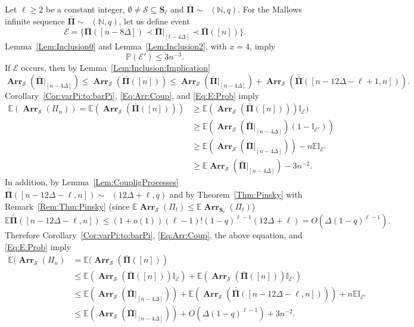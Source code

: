 \documentclass[letterpaper,11pt]{article}
\theoremstyle{definition}
\theoremstyle{remark}
\renewcommand{\le}{\leqslant}
\renewcommand{\ge}{\geqslant}
\DeclareMathOperator{\Mallows}{Mallows_{seq}}
\newcommand{\bE}{\mathbb{E}}
\newcommand{\bS}{\mathbf{S}}
\newcommand{\Arr}{\ensuremath{\operatorname{\mathbf{Arr}}}}
\newcommand{\Pra}[1]{\mathbb{P}\left(#1\right)}
\newcommand{\Ind}{\mathbb{I}}
\newcommand{\barPi}{\bar {\mathbf \Pi}}
\newcommand{\barbarPi}{{\bar{\bar {\mathbf \Pi}}}}
\newcommand{\NN}{\mathbb{N}}
\newcommand{\cS}{\mathcal{S}}
\newcommand{\cE}{\mathcal{E}}
\newcommand{\subseq}{\prec}
\begin{document}
Let $\ell\ge 2$ be a constant integer, $\emptyset\neq\cS\subseteq \bS_\ell$ and $\barPi\sim \Mallows(\NN,q)$. 
For the Mallows infinite sequence $\barPi\sim \Mallows(\NN,q)$,  let us define event
\begin{equation}\label{Eq:E:Def}
	\cE=\{\barPi([n-8\Delta])\subseq \barPi|_{[t-4\Delta]}\subseq \barPi([n])\}.
\end{equation}
Lemma~\ref{Lem:Inclusion0} and Lemma~\ref{Lem:Inclusion2}, with $x=4$, imply
\begin{equation}\label{Eq:E:Prob}
	\Pra{\cE'}\le 3n^{-3}.
\end{equation}
If $\cE$ occurs, then by Lemma~\ref{Lem:Inclusion:Implication}
\begin{equation}\label{Eq:Arr:Coup}
	\Arr_{\cS}(\barPi|_{[n-4\Delta]})\le \Arr_{\cS}(\barPi([n]))\le \Arr_{\cS}(\barPi|_{[n-4\Delta]})+\Arr_{\cS}(\barbarPi([n-12\Delta-\ell+1,n])).
\end{equation}
Corollary~\ref{Cor:varPi:to:barPi}, \eqref{Eq:Arr:Coup}, and \eqref{Eq:E:Prob} imply
\[
\begin{split}
	\bE(\Arr_{\cS}(\varPi_n))
	=
	\bE(\Arr_{\cS}(\barPi([n])))
	&\ge
	\bE(\Arr_{\cS}(\barPi([n])))\Ind_{\cE})
	\\
	&\ge 
	\bE(\Arr_{\cS}(\barPi|_{[n-4\Delta]})(1-\Ind_{\cE'}))\\
	&\ge \bE(\Arr_{\cS}(\barPi|_{[n-4\Delta]}))-n\bE \Ind_{\cE'}\\
	&\ge \bE\Arr_{\cS}(\barPi|_{[n-4\Delta]})-3n^{-2}.
\end{split}	
\]
In addition, by Lemma~\ref{Lem:CoupligProcesses} $\barbarPi([n-12\Delta-\ell,n])\sim\Mallows (12\Delta+\ell,q)$ and by Theorem~\ref{Thm:Pinsky} with Remark~\ref{Rem:Thm:Pinsky} (since $\bE\Arr_{\cS}(\varPi_t)\le \bE\Arr_{\bS_\ell}(\varPi_t)$) 
\[\bE \barbarPi([n-12\Delta-\ell,n]) \le (1+o(1)) (\ell-1)!(1-q)^{\ell-1}(12\Delta+\ell)=O\left(\Delta(1-q)^{\ell-1}\right). \]
Therefore Corollary~\ref{Cor:varPi:to:barPi}, \eqref{Eq:Arr:Coup},  the above equation, and \eqref{Eq:E:Prob} imply 
\[
\begin{split}
	\bE(\Arr_{\cS}(\varPi_n)
	&=\bE(\Arr_{\cS}(\barPi([n]))\\
	&\le 
	\bE(\Arr_{\cS}(\barPi([n]))\Ind_{\cE})+\bE(\Arr_{\cS}(\barPi([n]))\Ind_{\cE'})\\
	&\le \bE(\Arr_{\cS}(\barPi|_{[n-4\Delta]}))+\bE(\Arr_{\cS}(\barbarPi([n-12\Delta-\ell,n])))+n\bE \Ind_{\cE'}\\
	&\le \bE(\Arr_{\cS}(\barPi|_{[n-4\Delta]}))+O\left(\Delta(1-q)^{\ell-1}\right)+3n^{-2}.
\end{split}	
\]
\end{document}
